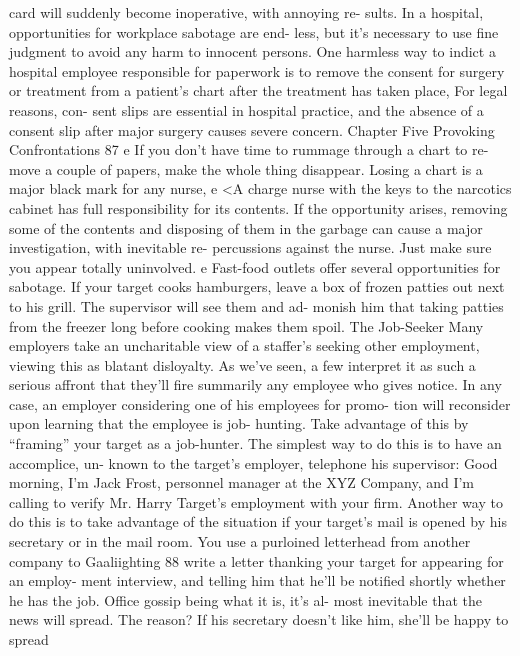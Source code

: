 \documentclass{book}
\begin{document}
card will suddenly become inoperative, with annoying re- 
sults. 
In a hospital, opportunities for workplace sabotage are end- 
less, but it's necessary to use fine judgment to avoid any 
harm to innocent persons. One harmless way to indict a 
hospital employee responsible for paperwork is to remove 
the consent for surgery or treatment from a patient's chart 
after the treatment has taken place, For legal reasons, con- 
sent slips are essential in hospital practice, and the absence 
of a consent slip after major surgery causes severe concern. 
Chapter Five 
Provoking Confrontations 
87 
e If you don't have time to rummage through a chart to re- 
move a couple of papers, make the whole thing disappear. 
Losing a chart is a major black mark for any nurse, 
e <A charge nurse with the keys to the narcotics cabinet has 
full responsibility for its contents. If the opportunity arises, 
removing some of the contents and disposing of them in the 
garbage can cause a major investigation, with inevitable re- 
percussions against the nurse. Just make sure you appear 
totally uninvolved. 
e Fast-food outlets offer several opportunities for sabotage. If 
your target cooks hamburgers, leave a box of frozen patties 
out next to his grill. The supervisor will see them and ad- 
monish him that taking patties from the freezer long before 
cooking makes them spoil. 
The Job-Seeker 
Many employers take an uncharitable view of a staffer’s 
seeking other employment, viewing this as blatant disloyalty. 
As we've seen, a few interpret it as such a serious affront that 
they'll fire summarily any employee who gives notice. In any 
case, an employer considering one of his employees for promo- 
tion will reconsider upon learning that the employee is job- 
hunting. Take advantage of this by “framing” your target as a 
job-hunter. 
The simplest way to do this is to have an accomplice, un- 
known to the target's employer, telephone his supervisor: 
Good morning, I'm Jack Frost, personnel manager 
at the XYZ Company, and I'm calling to verify Mr. 
Harry Target's employment with your firm. 
Another way to do this is to take advantage of the situation 
if your target's mail is opened by his secretary or in the mail 
room. You use a purloined letterhead from another company to  Gaaliighting 
88 
write a letter thanking your target for appearing for an employ- 
ment interview, and telling him that he'll be notified shortly 
whether he has the job. Office gossip being what it is, it’s al- 
most inevitable that the news will spread. The reason? 
If his secretary doesn't like him, she'll be happy to spread 
\end{document}
